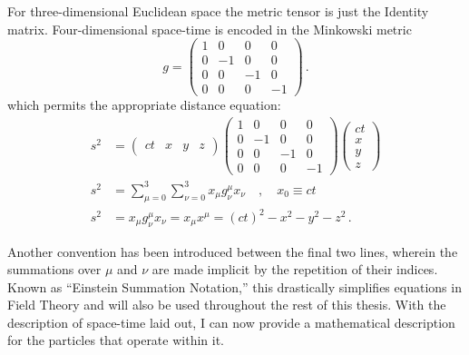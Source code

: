     For three-dimensional Euclidean space the metric tensor is just the Identity matrix.
    Four-dimensional space-time is encoded in the Minkowski metric
    \begin{equation}
        g = \begin{pmatrix}
            1 &  0 &  0 &  0 \\
            0 & -1 &  0 &  0 \\
            0 &  0 & -1 &  0 \\
            0 &  0 &  0 & -1
        \end{pmatrix}
        \,.
    \end{equation}
    which permits the appropriate distance equation:
    \begin{equation} \begin{split}
        s^2 &= \begin{pmatrix} ct & x & y & z\end{pmatrix} 
            \begin{pmatrix}
                1 &  0 &  0 &  0 \\
                0 & -1 &  0 &  0 \\
                0 &  0 & -1 &  0 \\
                0 &  0 &  0 & -1
            \end{pmatrix}
            \begin{pmatrix} ct \\ x \\ y \\ z \end{pmatrix} \\
        s^2 &= \sum\limits_{\mu=0}^3 \sum\limits_{\nu=0}^3 x_\mu g^\mu_\nu x_\nu
            \quad , \quad x_0 \equiv ct \\
        s^2 &= x_\mu g^\mu_\nu x_\nu = x_\mu x^\mu = (ct)^2-x^2-y^2-z^2
        \,.
    \end{split} \end{equation}

    Another convention has been introduced between the final two lines,
        wherein the summations over $\mu$ and $\nu$ are made implicit by the repetition of their indices.
    Known as ``Einstein Summation Notation,'' this drastically simplifies equations in Field Theory
        and will also be used throughout the rest of this thesis.
    With the description of space-time laid out,
        I can now provide a mathematical description for the particles that operate within it.


